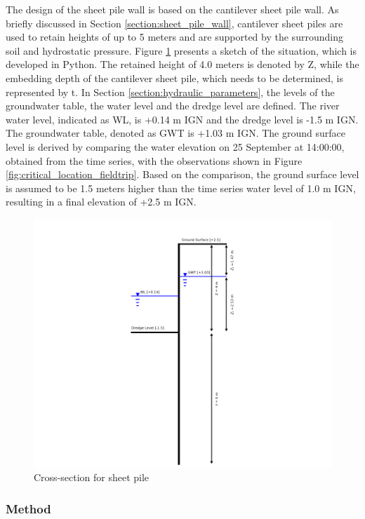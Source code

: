 The design of the sheet pile wall is based on the cantilever sheet pile wall. As briefly discussed in Section \ref{section:sheet_pile_wall}, cantilever sheet piles are used to retain heights of up to 5 meters and are supported by the surrounding soil and hydrostatic pressure. Figure \ref{fig:problem_description_sheetpiles} presents a sketch of the situation, which is developed in Python. The retained height of 4.0 meters is denoted by Z, while the embedding depth of the cantilever sheet pile, which needs to be determined, is represented by t. In  Section \ref{section:hydraulic_parameters}, the levels of the groundwater table, the water level and the dredge level are defined. The river water level, indicated as WL, is +0.14 m IGN and the dredge level is -1.5 m IGN. The groundwater table, denoted as GWT is +1.03 m IGN. The ground surface level is derived by comparing the water elevation on 25 September at 14:00:00, obtained from the time series, with the observations shown in Figure \ref{fig:critical_location_fieldtrip}. Based on the comparison, the ground surface level is assumed to be 1.5 meters higher than the time series water level of 1.0 m IGN, resulting in a final elevation of +2.5 m IGN.

\begin{figure}[H]
    \centering
    \includegraphics[width=0.90\linewidth]{figures/ch8/cross_section.png}
    \caption{Cross-section for sheet pile}
    \label{fig:problem_description_sheetpiles}
\end{figure}

\subsubsection{Method}

